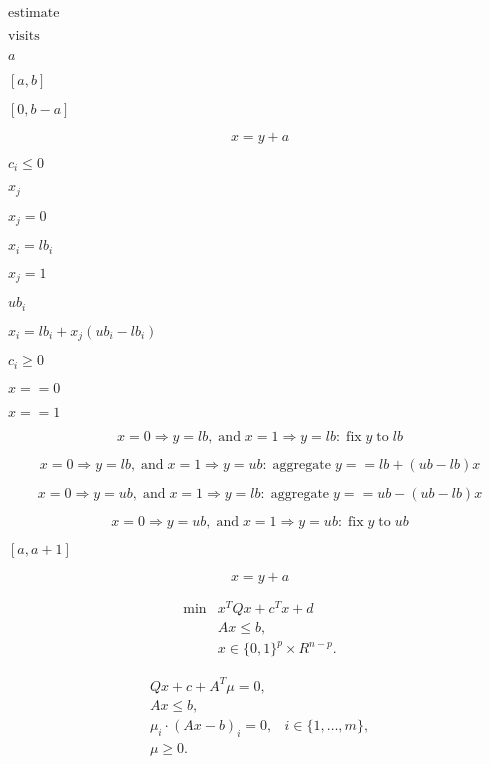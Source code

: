 \documentclass{article}
\begin{document}
$\mbox{estimate}$
\pagebreak

$\mbox{visits}$
\pagebreak

$a$
\pagebreak

$[a,b]$
\pagebreak

$[0,b-a]$
\pagebreak

\[
x = y + a
\]
\pagebreak

$c_i \leq 0$
\pagebreak

$x_j$
\pagebreak

$x_j = 0$
\pagebreak

$x_i = lb_i$
\pagebreak

$x_j = 1$
\pagebreak

$ub_i$
\pagebreak

$x_i = lb_i + x_j (ub_i - lb_i)$
\pagebreak

$c_i \geq 0$
\pagebreak

$x == 0$
\pagebreak

$x == 1$
\pagebreak

\[
 x = 0 \Rightarrow y = lb,\; \mathrm{and}\; x = 1 \Rightarrow y = lb:\; \mathrm{fix}\; y\; \mathrm{to}\; lb
\]
\pagebreak

\[
 x = 0 \Rightarrow y = lb,\; \mathrm{and}\; x = 1 \Rightarrow y = ub:\; \mathrm{aggregate}\; y == lb + (ub-lb)x
\]
\pagebreak

\[
 x = 0 \Rightarrow y = ub,\; \mathrm{and}\; x = 1 \Rightarrow y = lb:\; \mathrm{aggregate}\;  y == ub - (ub-lb)x
\]
\pagebreak

\[
 x = 0 \Rightarrow y = ub,\; \mathrm{and}\; x = 1 \Rightarrow y = ub:\; \mathrm{fix}\; y\; \mathrm{to}\; ub
\]
\pagebreak

$[a,a+1]$
\pagebreak

\[
  x = y + a
\]
\pagebreak

\[
 \begin{array}{ll}
 \min         & x^T Q x + c^T x + d \\
              & A x \leq b, \\
              & x \in \{0, 1\}^{p} \times R^{n-p}.
\end{array}
\]
\pagebreak

\[
 \begin{array}{ll}
  Q x + c + A^T \mu = 0,\\
  Ax \leq b,\\
  \mu_i \cdot (Ax - b)_i = 0,    & i \in \{1, \dots, m\},\\
  \mu \geq 0.
\end{array}
\]
\pagebreak
\end{document}
